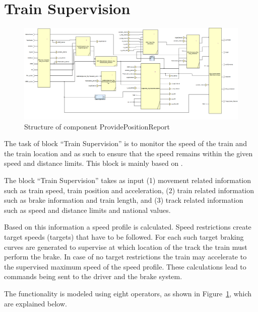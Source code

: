 
\section{Train Supervision}

\begin{figure}
\centering
\includegraphics[width=0.95\textheight, angle=90]{../images/speedsupervision.png}
\caption{Structure of component ProvidePositionReport}\label{fig:ssv}
\end{figure}

The task of block ``Train Supervision'' is to monitor the speed of the train and the train location and as such to ensure that the speed remains within the given speed and distance limits. This block is mainly based on \cite[Chapt.~3.13]{subset-026}.

The block ``Train Supervision'' takes as input (1) movement related information such as train speed, train position and acceleration, (2) train related information such as brake information and train length, and (3) track related information such as speed and distance limits and national values.

Based on this information a speed profile is calculated. Speed restrictions create target speeds (targets) that have to be followed. For each such target braking curves are generated to supervise at which location of the track the train must perform the brake. In case of no target restrictions the train may accelerate to the supervised maximum speed of the speed profile. These calculations lead to commands being sent to the driver and the brake system.

The functionality is modeled using eight operators, as shown in Figure~\ref{fig:ssv}, which are explained below.

